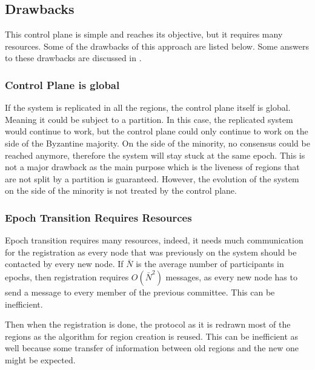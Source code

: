\documentclass[a4paper,11pt,twoside,openright]{report}
\begin{document}
\subsection{Drawbacks}
This control plane is simple and reaches its objective, but it requires many
resources. Some of the drawbacks of this approach are listed below. 
Some answers to these drawbacks are discussed in .  

\subsubsection{Control Plane is global}
If the system is replicated in all the regions, the control plane itself is
global. Meaning it could be subject to a partition. In this case, the replicated
system would continue to work, but the control plane could only continue to
work on the side of the Byzantine majority.  On the side of the minority, no consensus could be reached anymore, therefore the system will stay stuck at the same epoch. This is not a major drawback as the main
purpose which is the liveness of regions that are not split by a partition is guaranteed. However, the
evolution of the system on the side of the minority is not treated by the
control plane.

\subsubsection{Epoch Transition Requires Resources}
Epoch transition requires many resources, indeed, it needs much
communication for the registration as every node that was
previously on the system should be contacted by every new node. If $\bar{N}$ is
the average number of participants in epochs, then registration 
requires $O(\bar{N}^2)$ messages, as every new node has to send a message
to every member of the previous committee. This can be inefficient. 

Then when the registration is done, the protocol as it is redrawn most of
the regions as the algorithm for region creation is reused. This can be
inefficient as well because some transfer of information between old regions
and the new one might be expected.
\end{document}
